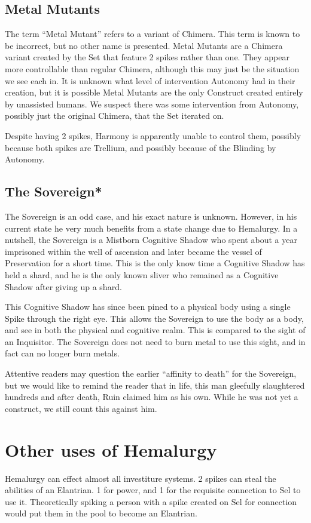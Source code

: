\documentclass[conference]{IEEEtran}
\newcommand{\n}{\hfill\break}
\begin{document}
\subsection*{\textbf{Metal Mutants}}
The term ``Metal Mutant'' refers to a variant of Chimera.\cite{TLM-CH56}  This term is known to be incorrect, but no other name is presented.  Metal Mutants are a Chimera variant created by the Set that feature 2 spikes rather than one.\cite{TLM-CH55}  They appear more controllable than regular Chimera, although this may just be the situation we see each in.  It is unknown what level of intervention Autonomy had in their creation, but it is possible Metal Mutants are the only Construct created entirely by unassisted humans.  We suspect there was some intervention from Autonomy, possibly just the original Chimera, that the Set iterated on.

Despite having 2 spikes, Harmony is apparently unable to control them, possibly because both spikes are Trellium, and possibly because of the Blinding by Autonomy.

\subsection*{\textbf{The Sovereign}*} The Sovereign is an odd case, and his exact nature is unknown.  However, in his current state he very much benefits from a state change due to Hemalurgy.  In a nutshell, the Sovereign is a Mistborn Cognitive Shadow who spent about a year imprisoned within the well of ascension and later became the vessel of Preservation for a short time.\cite{SH}  This is the only know time a Cognitive Shadow has held a shard, and he is the only known sliver who remained as a Cognitive Shadow after giving up a shard. 

This Cognitive Shadow has since been pined to a physical body using a single Spike through the right eye. This allows the Sovereign to use the body as a body, and see in both the physical and cognitive realm.  This is compared to the sight of an Inquisitor.  The Sovereign does not need to burn metal to use this sight, and in fact can no longer burn metals.\cite{TLM-3WAD} 

Attentive readers may question the earlier ``affinity to death'' for the Sovereign, but we would like to remind the reader that in life, this man gleefully slaughtered hundreds\cite{TFE-CH5} and after death, Ruin claimed him as his own.\cite{SH-PT3-CH3}  While he was not yet a construct, we still count this against him.\n
\section{\textbf{Other uses of Hemalurgy}}
Hemalurgy can effect almost all investiture systems.\cite{HE-universal}  2 spikes can steal the abilities of an Elantrian.  1 for power, and 1 for the requisite connection to Sel to use it.\cite{HE-elantrian}  Theoretically spiking a person with a spike created on Sel for connection would put them in the pool to become an Elantrian.\cite{HE-pool}
\end{document}

